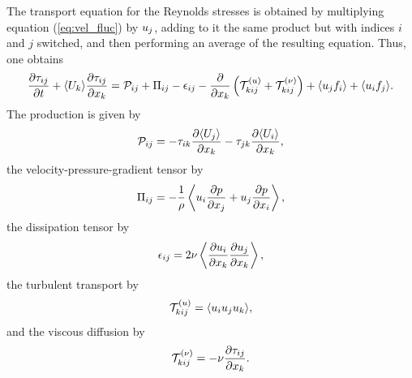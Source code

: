 \documentclass[oneside,a4paper,11pt]{report}
\begin{document}
The transport equation for the Reynolds stresses is obtained by multiplying equation (\ref{eq:vel_fluc}) by $u_j$, adding to it the same product but with indices $i$ and $j$ switched, and then performing an average of the resulting equation. Thus, one obtains
\begin{equation}
\label{rs_transport}
\frac{\partial \tau_{ij}}{\partial t} + \langle U_k \rangle \frac{\partial \tau_{ij}}{\partial x_k} = \mathcal{P}_{ij} + \Pi_{ij} - \epsilon_{ij} - \frac{\partial}{\partial x_k} \left ( \mathcal{T}^{(u)}_{kij} + \mathcal{T}^{(\nu)}_{kij} \right ) + \langle u_j f_i \rangle + \langle u_i f_j \rangle.
\end{equation}
The production is given by
\begin{equation}
\mathcal{P}_{ij} = -\tau_{ik} \frac{\partial \langle U_j \rangle}{\partial x_k} - \tau_{jk} \frac{\partial \langle U_i \rangle}{\partial x_k},
\end{equation}
the velocity-pressure-gradient tensor by
\begin{equation}
\Pi_{ij} = -\frac{1}{\rho} \left \langle u_i \frac{\partial p}{\partial x_j} + u_j \frac{\partial p}{\partial x_i} \right \rangle,
\end{equation}
the dissipation tensor by
\begin{equation}
\epsilon_{ij} = 2 \nu \left \langle \frac{\partial u_i}{\partial x_k}\frac{\partial u_j}{\partial x_k} \right \rangle,
\end{equation}
the turbulent transport by
\begin{equation}
\mathcal{T}^{(u)}_{kij} = \langle u_i u_j u_k \rangle,
\end{equation}
and the viscous diffusion by
\begin{equation}
\mathcal{T}^{(\nu)}_{kij} = -\nu \frac{\partial \tau_{ij}}{\partial x_k}.
\end{equation}
\end{document}
